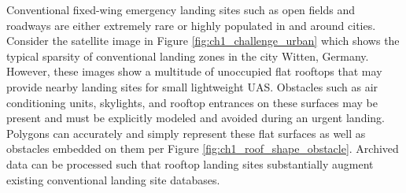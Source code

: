Conventional fixed-wing emergency landing sites such as open fields and roadways are either extremely rare or highly populated in and around cities. Consider the satellite image in Figure \ref{fig:ch1_challenge_urban} which shows the typical sparsity of conventional landing zones in the city Witten, Germany. However, these images show a multitude of unoccupied flat rooftops that may provide nearby landing sites for small lightweight UAS. Obstacles such as air conditioning units, skylights, and rooftop entrances on these surfaces may be present and must be explicitly modeled and avoided during an urgent landing. Polygons can accurately and simply represent these flat surfaces as well as obstacles embedded on them per Figure \ref{fig:ch1_roof_shape_obstacle}. Archived data can be processed such that rooftop landing sites substantially augment existing conventional landing site databases.











